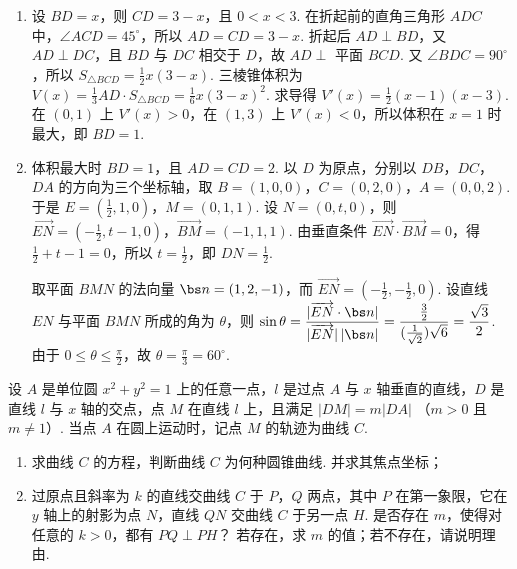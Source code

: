 \begin{solution}
\begin{enumerate}
\item 设 \(BD=x\)，则 \(CD=3-x\)，且 \(0<x<3\). 在折起前的直角三角形 \(ADC\) 中，\(\angle ACD=45^{\circ}\)，所以 \(AD=CD=3-x\). 折起后 \(AD\perp BD\)，又 \(AD\perp DC\)，且 \(BD\) 与 \(DC\) 相交于 \(D\)，故 \(AD\perp\) 平面 \(BCD\). 又 \(\angle BDC=90^{\circ}\)，所以 \(S_{\triangle BCD}=\frac12x(3-x)\). 三棱锥体积为 \(\displaystyle V(x)=\frac13AD\cdot S_{\triangle BCD}=\frac16x(3-x)^2\). 求导得 \(V'(x)=\frac12(x-1)(x-3)\). 在 \((0,1)\) 上 \(V'(x)>0\)，在 \((1,3)\) 上 \(V'(x)<0\)，所以体积在 \(x=1\) 时最大，即 \(BD=1\).
\item 体积最大时 \(BD=1\)，且 \(AD=CD=2\). 以 \(D\) 为原点，分别以 \(DB\)，\(DC\)，\(DA\) 的方向为三个坐标轴，取 \(B=(1,0,0)\)，\(C=(0,2,0)\)，\(A=(0,0,2)\). 于是 \(E=\left(\frac12,1,0\right)\)，\(M=(0,1,1)\). 设 \(N=(0,t,0)\)，则 \(\overrightarrow{EN}=\left(-\frac12,t-1,0\right)\)，\(\overrightarrow{BM}=(-1,1,1)\). 由垂直条件 \(\overrightarrow{EN}\cdot\overrightarrow{BM}=0\)，得 \(\frac12+t-1=0\)，所以 \(t=\frac12\)，即 \(DN=\frac12\).

取平面 \(BMN\) 的法向量 \(\bs n=(1,2,-1)\)，而 \(\overrightarrow{EN}=\left(-\frac12,-\frac12,0\right)\). 设直线 \(EN\) 与平面 \(BMN\) 所成的角为 \(\theta\)，则 \(\displaystyle\sin\theta=\frac{|\overrightarrow{EN}\cdot\bs n|}{|\overrightarrow{EN}|\,|\bs n|}=\frac{\frac{3}{2}}{(\frac{1}{\sqrt2})\sqrt6}=\frac{\sqrt3}{2}\). 由于 \(0\leqslant\theta\leqslant\frac\pi2\)，故 \(\theta=\frac\pi3=60^{\circ}\).
\end{enumerate}
\end{solution}

\setcounter{probnum}{20}
\begin{problem}
设 \(A\) 是单位圆 \(x^{2} + y^{2} = 1\) 上的任意一点，\(l\) 是过点 \(A\) 与 \(x\) 轴垂直的直线，\(D\) 是直线 \(l\) 与 \(x\) 轴的交点，点 \(M\) 在直线 \(l\) 上，且满足 \(|DM| = m|DA|\) （\(m > 0\) 且 \(m \neq 1\)）. 当点 \(A\) 在圆上运动时，记点 \(M\) 的轨迹为曲线 \(C\).

\begin{enumerate}
\item 求曲线 \(C\) 的方程，判断曲线 \(C\) 为何种圆锥曲线. 并求其焦点坐标；
\item 过原点且斜率为 \(k\) 的直线交曲线 \(C\) 于 \(P\)，\(Q\) 两点，其中 \(P\) 在第一象限，它在 \(y\) 轴上的射影为点 \(N\)，直线 \(QN\) 交曲线 \(C\) 于另一点 \(H\). 是否存在 \(m\)，使得对任意的 \(k > 0\)，都有 \(PQ \perp PH\)？ 若存在，求 \(m\) 的值；若不存在，请说明理由.
\end{enumerate}
\end{problem}

